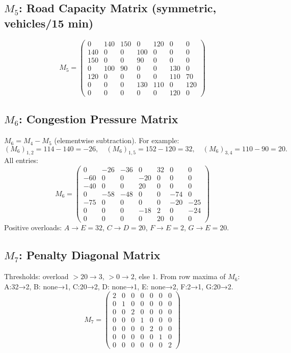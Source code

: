 \documentclass{ximera}
\begin{document}
\subsection*{\texorpdfstring{\(M_5\)}{M5}: Road Capacity Matrix (symmetric, vehicles/15 min)}
\[
M_5 = \begin{pmatrix}
0 & 140 & 150 & 0 & 120 & 0 & 0\\
140 & 0 & 0 & 100 & 0 & 0 & 0\\
150 & 0 & 0 & 90 & 0 & 0 & 0\\
0 & 100 & 90 & 0 & 0 & 130 & 0\\
120 & 0 & 0 & 0 & 0 & 110 & 70\\
0 & 0 & 0 & 130 & 110 & 0 & 120\\
0 & 0 & 0 & 0 & 0 & 120 & 0
\end{pmatrix}
\]

\subsection*{\texorpdfstring{\(M_6\)}{M6}: Congestion Pressure Matrix}
\(M_6 = M_4 - M_5\) (elementwise subtraction). For example:
\[
(M_6)_{1,2} = 114 - 140 = -26,\quad (M_6)_{1,5} = 152 - 120 = 32,\quad (M_6)_{3,4} = 110 - 90 = 20.
\]
All entries:
\[
M_6 = \begin{pmatrix}
0   & -26 & -36 & 0   & 32  & 0 & 0\\
-60 & 0   & 0   & -20 & 0   & 0 & 0\\
-40 & 0   & 0   & 20  & 0   & 0 & 0\\
0   & -58 & -48 & 0   & 0   & -74& 0\\
-75 & 0   & 0   & 0   & 0   & -20& -25\\
0   & 0   & 0   & -18 & 2   & 0 & -24\\
0   & 0   & 0   & 0   & 20  & 0 & 0
\end{pmatrix}
\]
Positive overloads: \(A\rightarrow E=32\), \(C\rightarrow D=20\), \(F\rightarrow E=2\), \(G\rightarrow E=20\).

\subsection*{\texorpdfstring{\(M_7\)}{M7}: Penalty Diagonal Matrix}
Thresholds: overload \(>20 \to 3\), \(>0 \to 2\), else \(1\).  
From row maxima of \(M_6\): A:32→2, B: none→1, C:20→2, D: none→1, E: none→2, F:2→1, G:20→2.
\[
M_7 = \begin{pmatrix}
2 & 0 & 0 & 0 & 0 & 0 & 0\\
0 & 1 & 0 & 0 & 0 & 0 & 0\\
0 & 0 & 2 & 0 & 0 & 0 & 0\\
0 & 0 & 0 & 1 & 0 & 0 & 0\\
0 & 0 & 0 & 0 & 2 & 0 & 0\\
0 & 0 & 0 & 0 & 0 & 1 & 0\\
0 & 0 & 0 & 0 & 0 & 0 & 2
\end{pmatrix}
\]
\end{document}
